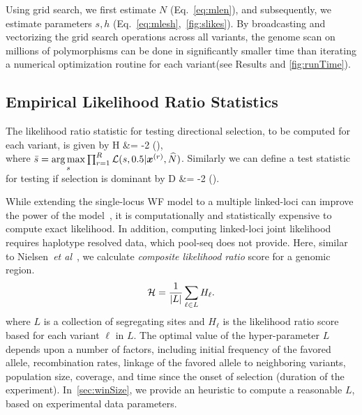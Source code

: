 Using grid search, we first estimate $N$ (Eq.~\ref{eq:mlen}), and
subsequently, we estimate parameters $s,h$ 
(Eq.~\ref{eq:mlesh},~\ref{fig:slikes}). By
broadcasting and vectorizing the grid search operations across all
variants, the genome scan on millions of polymorphisms can be done in
significantly smaller time than iterating a numerical optimization
routine for each variant(see Results and \ref{fig:runTime}).
\subsection{Empirical Likelihood Ratio Statistics}
The  likelihood
ratio statistic for testing directional selection, to be computed for each variant, 
is given by
\beq
	H &= -2 \log 
	\left(\right),\\
	\label{eq:ELRS}
\eeq
where $\bar{s} = \underset{s}{\arg \max} \prod_{r=1}^R 
 {\cal L}(s,0.5|\bm{x}^{(r)},\widehat{N})$. Similarly we can define a test statistic for testing 
 if selection is dominant by
\beq
 D &= -2 \log 
 \left(\right).
 \eeq



 While extending the single-locus WF model to a multiple linked-loci
 can improve the power of the model~\cite{Terhorst2015Multi}, it is
 computationally and statistically expensive to compute exact
 likelihood. In addition, computing linked-loci joint likelihood requires  
 haplotype resolved data, which pool-seq
 does not provide. Here, similar to Nielsen~\emph{et
   al}~\cite{nielsen2005genomic}, we calculate \emph{composite likelihood
 ratio} score for a genomic region.
\begin{equation}
{\cal H} = \frac{1}{|L|}\sum_{\ell \in L} H_\ell.
\label{eq:pihmm}
\end{equation}
where $L$ is a collection of segregating sites and $H_\ell$ is the
likelihood ratio score based for each variant $\ell$ in $L$.  The
optimal value of the hyper-parameter $L$ depends upon a number of
factors, including initial frequency of the favored allele,
recombination rates, linkage of the favored allele to neighboring
variants, population size, coverage, and time since the onset of
selection (duration of the experiment). In~\ref{sec:winSize}, we provide an 
heuristic 
to compute a reasonable $L$, based on experimental data parameters.

